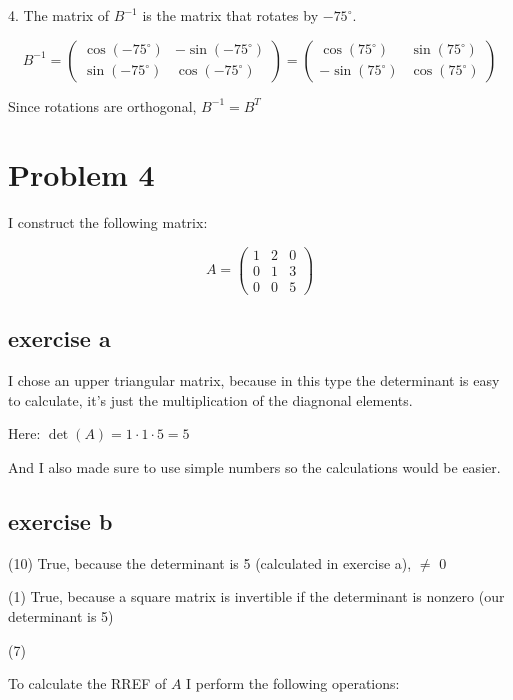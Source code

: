 \documentclass[11pt, a4paper]{article}
\begin{document}
4. The matrix of ${B}^{-1}$ is the matrix that rotates by $-75^\circ$.

\[
{B}^{-1} = \begin{pmatrix}
	\cos(-75^\circ) & -\sin(-75^\circ) \\
	\sin(-75^\circ) & \cos(-75^\circ)
\end{pmatrix} = \begin{pmatrix}
	\cos(75^\circ) & \sin(75^\circ) \\
	-\sin(75^\circ) & \cos(75^\circ)
\end{pmatrix}
\]

 Since rotations are orthogonal, ${B}^{-1} = {B}^T$




\pagebreak
\section*{Problem 4}

I construct the following matrix:

\[
A = \begin{pmatrix}
	1 & 2 & 0 \\
	0 & 1 & 3 \\
	0 & 0 & 5
\end{pmatrix}
\]


\subsection*{exercise a}

I chose an upper triangular matrix, because in this type the determinant is easy to calculate, it's just the multiplication of the diagnonal elements.

Here: $\det(A) = 1 \cdot 1 \cdot 5 = 5$

And I also made sure to use simple numbers so the calculations would be easier.



\subsection*{exercise b}

(10) True, because the determinant is 5 (calculated in exercise a), $\neq$ 0

(1) True, because a square matrix is invertible if the determinant is nonzero (our determinant is 5)

(7)

To calculate the RREF of $A$ I perform the following operations:
\end{document}
